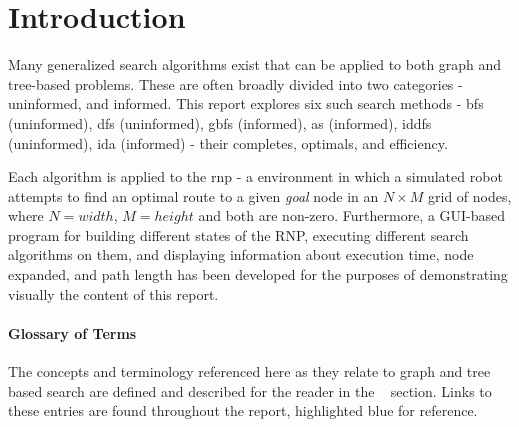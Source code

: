 \section{Introduction} %
\label{sec:introduction}
Many generalized search algorithms exist that can be applied to both graph and tree-based problems. These are often broadly divided into two categories - \Gls{uninformed}, and \Gls{informed}. This report explores six such search methods - \acrfull{bfs} (uninformed), \acrfull{dfs} (uninformed), \acrfull{gbfs} (informed), \acrfull{as} (informed), \acrfull{iddfs} (uninformed), \acrfull{ida} (informed) - their \glspl{complete}, \glspl{optimal}, and efficiency. \par
Each algorithm is applied to the \acrlong{rnp} - a \Gls{environment} in which a simulated robot attempts to find an optimal route to a given \textit{goal} \gls{node} in an $N \times M$ grid of nodes, where $N=width$, $M=height$ and both are non-zero. Furthermore, a GUI-based program for building different states of the RNP, executing different search algorithms on them, and displaying information about execution time, node expanded, and path length has been developed for the purposes of demonstrating visually the content of this report.

\paragraph{Glossary of Terms} %
\label{par:glossary_of_terms}
The concepts and terminology referenced here as they relate to graph and tree based search are defined and described for the reader in the ~\pageref{glossaries} section. Links to these entries are found throughout the report, highlighted blue for reference.
